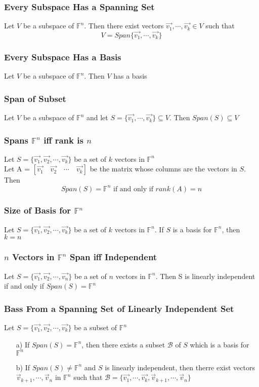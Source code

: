 \documentclass[12pt, letterpaper]{article}
\begin{document}
\subsubsection{Every Subspace Has a Spanning Set}
Let $V$ be a subspace of $\mathbb{F}^n$. Then there exist vectors $\vec{v_1}, \cdots,\vec{v_k}\in V$ such that 
\[V=Span\{\vec{v_1}, \cdots,\vec{v_k}\}\]
\subsubsection{Every Subspace Has a Basis}
Let $V$ be a subspace of $\mathbb{F}^n$. Then $V$ has a basis 
\subsubsection{Span of Subset}
Let $V$ be a subspace of $\mathbb{F}^n$ and let $S=\{\vec{v_1}, \cdots,\vec{v_k}\}\subseteq V$. Then $Span(S)\subseteq V$
\subsubsection{Spans $\mathbb{F}^n$ iff rank is $n$}
Let $S=\{\vec{v_1}, \vec{v_2}, \cdots, \vec{v_k}\}$ be a set of $k$ vectors in $\mathbb{F}^n$ \\
Let A = $[\vec{v_1}\quad \vec{v_2}\quad \cdots\quad \vec{v_k}]$ be the matrix whose columns are the vectors in $S$. Then 
\[Span(S) = \mathbb{F}^n \text{ if and only if } rank(A) = n\]
\subsubsection{Size of Basis for $\mathbb{F}^n$}
Let $S=\{\vec{v_1}, \vec{v_2}, \cdots, \vec{v_k}\}$ be a set of $k$ vectors in $\mathbb{F}^n$. If $S$ is a basis for $\mathbb{F}^n$, then $k=n$
\subsubsection{$n$ Vectors in $\mathbb{F}^n$ Span iff Independent}
Let $S=\{\vec{v_1}, \vec{v_2}, \cdots, \vec{v_n}\}$ be a set of $n$ vectors in $\mathbb{F}^n$. Then S is linearly independent if and only if $Span(S) = \mathbb{F}^n$
\subsubsection{Bass From a Spanning Set of Linearly Independent Set}
Let $S=\{\vec{v_1}, \vec{v_2}, \cdots, \vec{v_k}\}$ be a subset of $\mathbb{F}^n$
\begin{itemize}
    \item[a)] If $Span(S) = \mathbb{F}^n$, then there exists a subset $\mathcal{B}$ of $S$ which is a basis for $\mathbb{F}^n$
    \item[b)] If $Span(S)\neq\mathbb{F}^n$ and $S$ is linearly independent, then therre exist vectors $\vec{v}_{k+1},\cdots, \vec{v}_n$ in $\mathbb{F}^n$ such that $\mathcal{B} = \{\vec{v_1},\cdots,\vec{v_k}, \vec{v}_{k+1},\cdots, \vec{v}_n\}$
\end{itemize}
\end{document}
